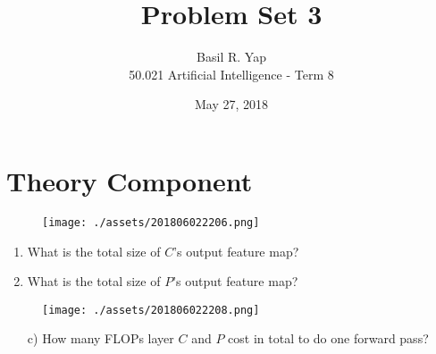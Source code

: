 \documentclass[12pt]{article}
\begin{document}
 
 
\title{Problem Set 3}%
\author{Basil R. Yap\\ %
50.021 Artificial Intelligence - Term 8} %
\date{May 27, 2018}
\maketitle

\section{Theory Component}
\begin{figure}[h!]
\texttt{[image: ./assets/201806022206.png]}
\end{figure}
\begin{enumerate}[label=\alph*)]
\item What is the total size of $C$'s output feature map?
\item What is the total size of $P$'s output feature map? 
\end{enumerate}
\begin{figure}[h!]
\texttt{[image: ./assets/201806022208.png]}
\end{figure}
\begin{enumerate}
\item[c)] How many FLOPs layer $C$ and $P$ cost in total to do one forward pass?
\end{enumerate}

\pagebreak
\end{document}
